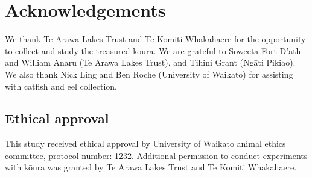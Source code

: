 \documentclass[
  12pt,
  a4paper,
  oneside]{scrbook}
\begin{document}
\section{Acknowledgements}\label{acknowledgements-1}

We thank Te Arawa Lakes Trust and Te Komiti Whakahaere for the
opportunity to collect and study the treasured kōura. We are grateful to
Soweeta Fort-D'ath and William Anaru (Te Arawa Lakes Trust), and Tihini
Grant (Ngāti Pikiao). We also thank Nick Ling and Ben Roche (University
of Waikato) for assisting with catfish and eel collection.

\subsection{Ethical approval}\label{ethical-approval}

This study received ethical approval by University of Waikato animal
ethics committee, protocol number: 1232. Additional permission to
conduct experiments with kōura was granted by Te Arawa Lakes Trust and
Te Komiti Whakahaere.
\end{document}
